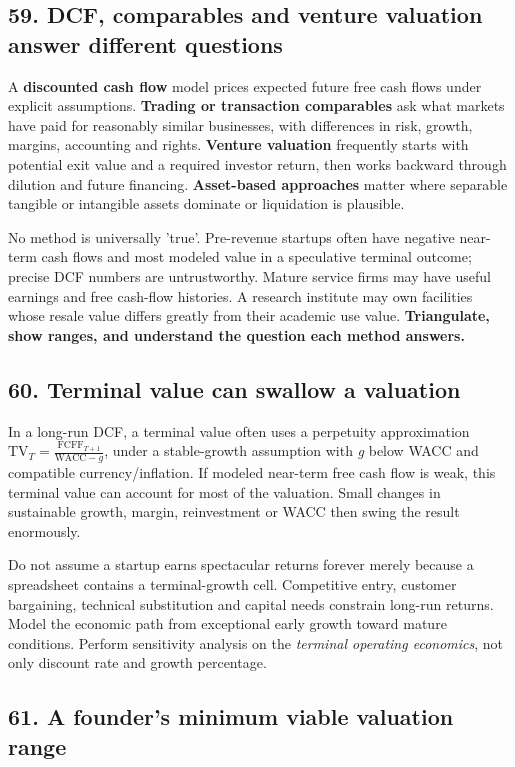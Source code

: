 \subsection{59. DCF, comparables and venture valuation answer different questions}


A \textbf{discounted cash flow} model prices expected future free cash flows under explicit assumptions. \textbf{Trading or transaction comparables} ask what markets have paid for reasonably similar businesses, with differences in risk, growth, margins, accounting and rights. \textbf{Venture valuation} frequently starts with potential exit value and a required investor return, then works backward through dilution and future financing. \textbf{Asset-based approaches} matter where separable tangible or intangible assets dominate or liquidation is plausible.

No method is universally 'true'. Pre-revenue startups often have negative near-term cash flows and most modeled value in a speculative terminal outcome; precise DCF numbers are untrustworthy. Mature service firms may have useful earnings and free cash-flow histories. A research institute may own facilities whose resale value differs greatly from their academic use value. \textbf{Triangulate, show ranges, and understand the question each method answers.}

\subsection{60. Terminal value can swallow a valuation}


In a long-run DCF, a terminal value often uses a perpetuity approximation $\mathrm{TV}_T = \frac{\mathrm{FCFF}_{T+1}}{\mathrm{WACC} - g}$, under a stable-growth assumption with \textit{g} below WACC and compatible currency/inflation. If modeled near-term free cash flow is weak, this terminal value can account for most of the valuation. Small changes in sustainable growth, margin, reinvestment or WACC then swing the result enormously.

Do not assume a startup earns spectacular returns forever merely because a spreadsheet contains a terminal-growth cell. Competitive entry, customer bargaining, technical substitution and capital needs constrain long-run returns. Model the economic path from exceptional early growth toward mature conditions. Perform sensitivity analysis on the \textit{terminal operating economics}, not only discount rate and growth percentage.

\subsection{61. A founder's minimum viable valuation range}


